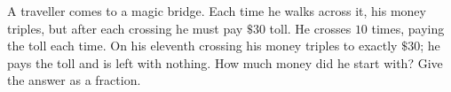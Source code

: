 A traveller comes to a magic bridge. Each time he walks across it, his money triples, but after each crossing he must pay $\$30$ toll. He crosses $10$ times, paying the toll each time. On his eleventh crossing his money triples to exactly $\$30$; he pays the toll and is left with nothing. How much money did he start with? Give the answer as a fraction.
